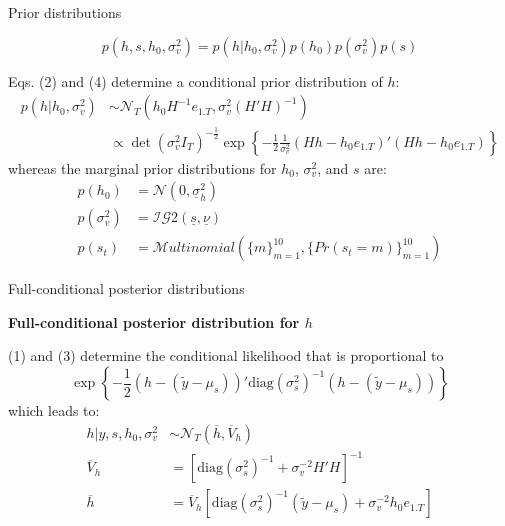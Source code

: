 \documentclass[notes,blackandwhite,mathsans,usenames,dvipsnames]{beamer}
\begin{document}
\begin{frame}{Prior distributions}

$$
p\left(h,s,h_0,\sigma_v^2\right) = p\left(h|h_0, \sigma_v^2\right)p\left(h_0\right)p\left(\sigma_v^2\right)p\left(s\right)
$$

{\color{mcxs2}Eqs.} (2) {\color{mcxs2}and} (4) {\color{mcxs2}determine a conditional prior distribution of} $h$:
\begin{align*}
p\left(h|h_0, \sigma_v^2\right) &\sim\mathcal{N}_T\left( h_0H^{-1}e_{1.T}, \sigma_v^2(H'H)^{-1} \right)\\
&\propto \det\left(\sigma^2_vI_T\right)^{-
\frac{1}{2}}\exp\left\{ -\frac{1}{2} \frac{1}{\sigma_v^2}(Hh - h_0 e_{1.T})'(Hh - h_0 e_{1.T}) \right\}
\end{align*}
{\color{mcxs2}whereas the marginal prior distributions for} $h_0$, $\sigma_v^2$, {\color{mcxs2}and} $s$ {\color{mcxs2}are:}
\begin{align*}
p(h_0) &= \mathcal{N}(0, \underline{\sigma}_h^2) \\
p\left(\sigma_v^2\right) &= \mathcal{IG}2(\underline{s}, \underline{\nu})\\
p\left(s_t\right) &= \mathcal{M}ultinomial\left(\{m\}_{m=1}^{10}, \{Pr(s_t=m)\}_{m=1}^{10} \right)
\end{align*}

\end{frame}




\begin{frame}{Full-conditional posterior distributions}

\textbf{Full-conditional posterior distribution for $h$}

 (1) {\color{mcxs2}and} (3) {\color{mcxs2}determine the conditional likelihood that is proportional to}
\begin{equation*}
\exp\left\{ -\frac{1}{2} (h - (\tilde{y} - \mu_s))'  \text{diag}\left(\sigma^2_s\right)^{-1} (h - (\tilde{y} - \mu_s)) \right\}
\end{equation*}
{\color{mcxs2}which leads to:}
\begin{align*}
h| y,s,h_0,\sigma_v^2 &\sim\mathcal{N}_T\left(\overline{h},\overline{V}_h  \right)\\
\overline{V}_h &= \left[ \text{diag}\left(  \sigma_s^2\right)^{-1} + \sigma_v^{-2}H'H \right]^{-1} \\
\overline{h} &= \overline{V}_h\left[ \text{diag}\left(  \sigma_s^2\right)^{-1}\left( \tilde{y} - \mu_s \right) + \sigma_v^{-2} h_0e_{1.T}\right]
\end{align*}

\end{frame}
\end{document}
